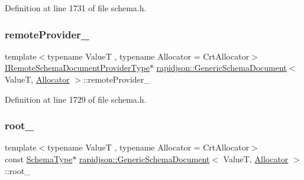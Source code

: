 Definition at line 1731 of file schema.\+h.

\mbox{\label{classrapidjson_1_1_generic_schema_document_a34513d08173e3499f3b6b906fdb7ce6a}} 
\subsubsection{\texorpdfstring{remoteProvider\_}{remoteProvider\_}}
{\footnotesize\ttfamily template$<$typename ValueT , typename Allocator  = Crt\+Allocator$>$ \\
\mbox{\hyperlink{classrapidjson_1_1_generic_schema_document_ab2764f2258889b3262eff6293d7ca015}{I\+Remote\+Schema\+Document\+Provider\+Type}}$\ast$ \mbox{\hyperlink{classrapidjson_1_1_generic_schema_document}{rapidjson\+::\+Generic\+Schema\+Document}}$<$ ValueT, \mbox{\hyperlink{classrapidjson_1_1_allocator}{Allocator}} $>$\+::remote\+Provider\+\_\+\hspace{0.3cm}{\ttfamily [private]}}



Definition at line 1729 of file schema.\+h.

\mbox{\label{classrapidjson_1_1_generic_schema_document_adb44efaa5ed363c73554de82958b4281}} 
\subsubsection{\texorpdfstring{root\_}{root\_}}
{\footnotesize\ttfamily template$<$typename ValueT , typename Allocator  = Crt\+Allocator$>$ \\
const \mbox{\hyperlink{classrapidjson_1_1_generic_schema_document_aaf4e7f371de938025f7ed4be3b83266e}{Schema\+Type}}$\ast$ \mbox{\hyperlink{classrapidjson_1_1_generic_schema_document}{rapidjson\+::\+Generic\+Schema\+Document}}$<$ ValueT, \mbox{\hyperlink{classrapidjson_1_1_allocator}{Allocator}} $>$\+::root\+\_\+\hspace{0.3cm}{\ttfamily [private]}}



